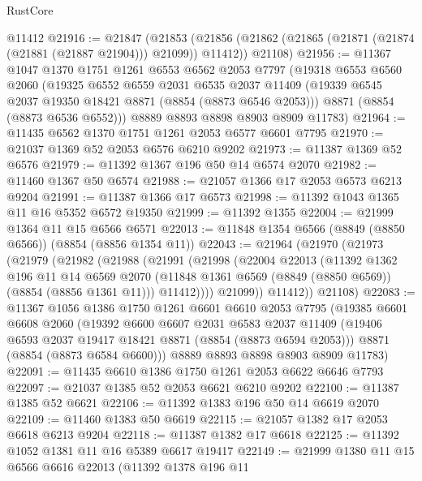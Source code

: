 \begin{lexlean}{RustCore}
\begin{coremodule}
    @11412
@21916 := @21847
    (@21853
      (@21856 (@21862 (@21865 (@21871 (@21874 (@21881 (@21887 @21904))) @21099)) @11412))
      @21108)
@21956 := @11367
    @1047
    @1370
    @1751
    @1261
    @6553
    @6562
    @2053
    @7797
    (@19318
      @6553
      @6560
      @2060
      (@19325
        @6552
        @6559
        @2031
        @6535
        @2037
        @11409
        (@19339 @6545 @2037 @19350 @18421 @8871 (@8854 (@8873 @6546 @2053)))
        @8871
        (@8854 (@8873 @6536 @6552)))
      @8889
      @8893
      @8898
      @8903
      @8909
      @11783)
@21964 := @11435 @6562 @1370 @1751 @1261 @2053 @6577 @6601 @7795
@21970 := @21037 @1369 @52 @2053 @6576 @6210 @9202
@21973 := @11387 @1369 @52 @6576
@21979 := @11392 @1367 @196 @50 @14 @6574 @2070
@21982 := @11460 @1367 @50 @6574
@21988 := @21057 @1366 @17 @2053 @6573 @6213 @9204
@21991 := @11387 @1366 @17 @6573
@21998 := @11392 @1043 @1365 @11 @16 @5352 @6572 @19350
@21999 := @11392 @1355
@22004 := @21999 @1364 @11 @15 @6566 @6571
@22013 := @11848 @1354 @6566 (@8849 (@8850 @6566)) (@8854 (@8856 @1354 @11))
@22043 := @21964
    (@21970
      (@21973
        (@21979
          (@21982
            (@21988
              (@21991
                (@21998
                  (@22004
                    @22013
                    (@11392
                      @1362
                      @196
                      @11
                      @14
                      @6569
                      @2070
                      (@11848 @1361 @6569 (@8849 (@8850 @6569)) (@8854 (@8856 @1361 @11)))
                      @11412))))
              @21099))
          @11412))
      @21108)
@22083 := @11367
    @1056
    @1386
    @1750
    @1261
    @6601
    @6610
    @2053
    @7795
    (@19385
      @6601
      @6608
      @2060
      (@19392
        @6600
        @6607
        @2031
        @6583
        @2037
        @11409
        (@19406 @6593 @2037 @19417 @18421 @8871 (@8854 (@8873 @6594 @2053)))
        @8871
        (@8854 (@8873 @6584 @6600)))
      @8889
      @8893
      @8898
      @8903
      @8909
      @11783)
@22091 := @11435 @6610 @1386 @1750 @1261 @2053 @6622 @6646 @7793
@22097 := @21037 @1385 @52 @2053 @6621 @6210 @9202
@22100 := @11387 @1385 @52 @6621
@22106 := @11392 @1383 @196 @50 @14 @6619 @2070
@22109 := @11460 @1383 @50 @6619
@22115 := @21057 @1382 @17 @2053 @6618 @6213 @9204
@22118 := @11387 @1382 @17 @6618
@22125 := @11392 @1052 @1381 @11 @16 @5389 @6617 @19417
@22149 := @21999
    @1380
    @11
    @15
    @6566
    @6616
    @22013
    (@11392
      @1378
      @196
      @11

\end{coremodule}
\end{lexlean}

